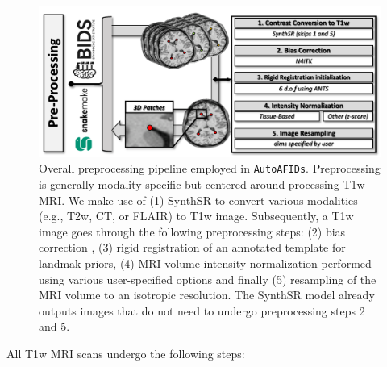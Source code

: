 \begin{figure}[hbt!]
    \centering
    \includegraphics[width=1\linewidth]{figs/ch3_Figure_proc.png}
    \caption{Overall preprocessing pipeline employed in \texttt{AutoAFIDs}. Preprocessing is generally modality specific but centered around processing T1w MRI. We make use of (1) SynthSR \cite{Iglesias2023-co} to convert various modalities (e.g., T2w, CT, or FLAIR) to T1w image. Subsequently, a T1w image goes through the following preprocessing steps: (2) bias correction \cite{Tustison2010-qu}, (3) rigid registration of an annotated template for landmak priors, (4) MRI volume intensity normalization performed using various user-specified options and finally (5) resampling of the MRI volume to an isotropic resolution. The SynthSR model already outputs images that do not need to undergo preprocessing steps 2 and 5.}
    \label{fig:ch3_Figure_proc}
\end{figure}


All T1w MRI scans undergo the following steps:

